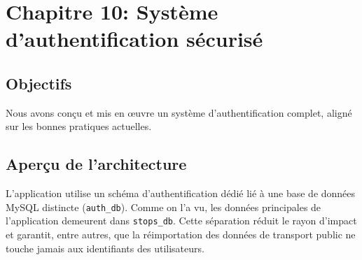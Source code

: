 \chapter{Chapitre 10: Système d'authentification sécurisé}\label{chap:auth}

\section{Objectifs}
Nous avons conçu et mis en œuvre un système d'authentification complet, aligné sur les bonnes pratiques actuelles.

\section{Aperçu de l'architecture}
L'application utilise un schéma d'authentification dédié lié à une base de données MySQL distincte (\texttt{auth\_db}). Comme on l'a vu, les données principales de l'application demeurent dans \texttt{stops\_db}. Cette séparation réduit le rayon d'impact et garantit, entre autres, que la réimportation des données de transport public ne touche jamais aux identifiants des utilisateurs.

